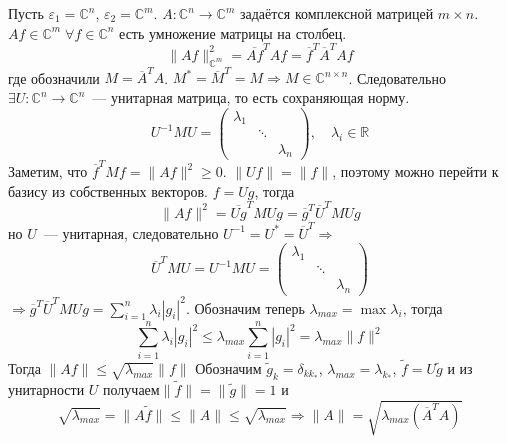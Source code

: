 \documentclass[14pt]{extarticle}
\begin{document}
\begin{Prim}
    Пусть $\varepsilon_1 = \mathbb C^n$, $\varepsilon_2 = \mathbb C^m$.
    $A : \mathbb C^n \to \mathbb C^m$ задаётся комплексной матрицей $m \times n$.
    $Af \in \mathbb C^m\; \forall f \in \mathbb C^n$ есть умножение матрицы на столбец.
    $$
    \|Af\|^2_{\mathbb C^m} = \overline{Af}^T Af = \overline{f}^T \overline{A}^T A f
    $$
    где обозначили $M = \overline{A}^T A$. 
    $M^*=\overline{M}^T=M \Rightarrow  M \in \mathbb C^{n \times n}$.
    Следовательно $\exists U : \mathbb C^n \to \mathbb C^n$~--- унитарная матрица, то есть сохраняющая норму.
    $$
    U^{-1}MU =
    \left(
        \begin{array}{ccc}
            \lambda_1 & \phantom{x} & \phantom{x}\\
            \phantom{x} & \ddots & \phantom{x}\\
            \phantom{x} & \phantom{x} & \lambda_n
        \end{array}
    \right), \quad \lambda_i \in \mathbb R
    $$
    Заметим, что $\overline{f}^TMf = \|Af\|^2 \ge 0$.
    $\|Uf\|=\|f\|$, поэтому можно перейти к базису из собственных векторов.
    $f=Ug$, тогда
    $$
    \|Af\|^2 = \overline{Ug}^TM Ug = \overline{g}^T \overline{U}^T M Ug
    $$
     но $U$~--- унитарная, следовательно
    $U^{-1} = U^* = \overline{U}^T \Rightarrow$
    $$
    \overline{U}^T M U = U^{-1} M U =
    \left(
        \begin{array}{ccc}
            \lambda_1 & \phantom{x} & \phantom{x}\\
            \phantom{x} & \ddots & \phantom{x}\\
            \phantom{x} & \phantom{x} & \lambda_n
        \end{array}
    \right)
    $$
    $\Rightarrow \overline{g}^T \overline{U}^T M Ug = \sum\limits_{i = 1}^n \lambda_i |g_i|^2$.
    Обозначим теперь $\lambda_{max} = \max\lambda_i$, тогда 
    $$
    \sum\limits_{i = 1}^n \lambda_i |g_i|^2 \le \lambda_{max}\sum\limits_{i = 1}^n |g_i|^2 = \lambda_{max} \|f\|^2
    $$
    Тогда $\|Af\| \le \sqrt{\lambda_{max}}\|f\|$
    Обозначим $\tilde{g}_k = \delta_{kk_*}$, $\lambda_{max} = \lambda_{k_*}$, $\tilde{f} = U\tilde{g}$ и из унитарности $U$ получаем$\|\tilde{f}\| = \|\tilde{g}\| = 1$ и 
    $$
    \sqrt{\lambda_{max}} = \|A\tilde{f}\| \le \|A\| \le \sqrt{\lambda_{max}} \Rightarrow \|A\| = \sqrt{\lambda_{max}(\overline{A}^T A)}
    $$
\end{Prim}
\end{document}
